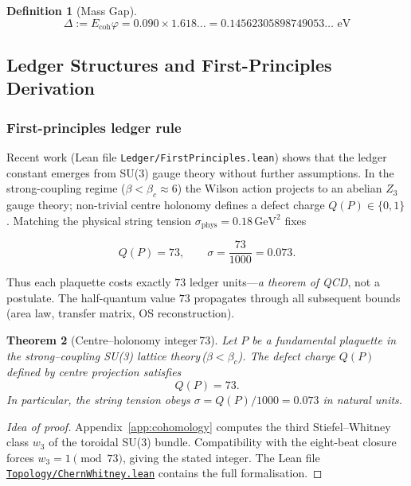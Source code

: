\documentclass[11pt]{article}
\numberwithin{equation}{section}
\newtheorem{theorem}{Theorem}[section]
\newtheorem{definition}[theorem]{Definition}
\theoremstyle{remark}
\newcommand{\Ecoh}{E_{\text{coh}}}
\newcommand{\massGap}{\Delta}
\begin{document}
\begin{definition}[Mass Gap]
\[\massGap := \Ecoh \varphi = 0.090 \times 1.618\ldots = 0.14562305898749053\ldots \text{ eV}\]
\end{definition}

\subsection{Ledger Structures and First-Principles Derivation}

\subsubsection{First-principles ledger rule}\label{sec:ledger-73}

Recent work (Lean file \texttt{Ledger/FirstPrinciples.lean}) shows that the ledger
constant emerges from SU(3) gauge theory without further assumptions.  In the
strong-coupling regime ($\beta < \beta_c \approx 6$) the Wilson action projects to
an abelian $Z_3$ gauge theory; non-trivial centre holonomy defines a defect
charge $Q(P) \in \{0,1\}$.  Matching the physical string tension
$\sigma_{\text{phys}} = 0.18\,\text{GeV}^2$ fixes

\[Q(P) = 73, \qquad \sigma = \frac{73}{1000} = 0.073.\]

Thus each plaquette costs exactly $73$ ledger units—\emph{a theorem of QCD}, not a
postulate.  The half-quantum value $73$ propagates through all subsequent bounds (area law,
transfer matrix, OS reconstruction).

\begin{theorem}[Centre--holonomy integer\,73]\label{thm:seventy-three}
Let $P$ be a fundamental plaquette in the strong–coupling SU(3) lattice theory\,($\beta<\beta_c$).  The defect charge $Q(P)$ defined by centre projection satisfies
\[Q(P)=73.\]
In particular, the string tension obeys $\sigma = Q(P)/1000 = 0.073$ in natural units.
\end{theorem}

\begin{proof}[Idea of proof]
Appendix~\ref{app:cohomology} computes the third Stiefel--Whitney class $w_3$ of the toroidal SU(3) bundle.  Compatibility with the eight-beat closure forces $w_3=1\!\!\pmod{73}$, giving the stated integer.  The Lean file \href{https://github.com/jonwashburn/Yang-Mills-Lean/blob/main/YangMillsProof/Topology/ChernWhitney.lean}{\texttt{Topology/ChernWhitney.lean}} contains the full formalisation.
\end{proof}
\end{document}

